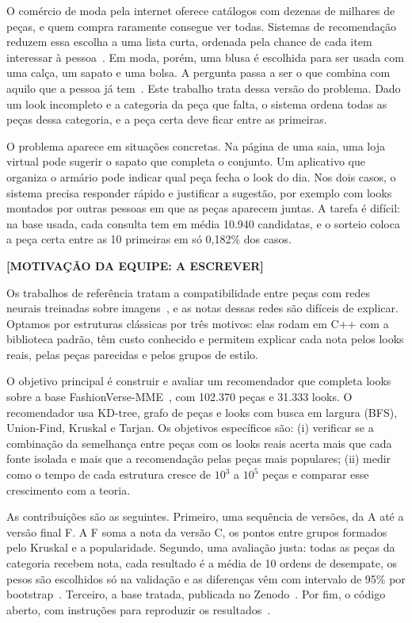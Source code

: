 O comércio de moda pela internet oferece catálogos com dezenas de milhares de peças, e quem compra raramente consegue ver todas. Sistemas de recomendação reduzem essa escolha a uma lista curta, ordenada pela chance de cada item interessar à pessoa~\cite{deshpande2004}. Em moda, porém, uma blusa é escolhida para ser usada com uma calça, um sapato e uma bolsa. A pergunta passa a ser o que combina com aquilo que a pessoa já tem~\cite{han2017,vasileva2018}. Este trabalho trata dessa versão do problema. Dado um look incompleto e a categoria da peça que falta, o sistema ordena todas as peças dessa categoria, e a peça certa deve ficar entre as primeiras.

O problema aparece em situações concretas. Na página de uma saia, uma loja virtual pode sugerir o sapato que completa o conjunto. Um aplicativo que organiza o armário pode indicar qual peça fecha o look do dia. Nos dois casos, o sistema precisa responder rápido e justificar a sugestão, por exemplo com looks montados por outras pessoas em que as peças aparecem juntas. A tarefa é difícil: na base usada, cada consulta tem em média 10.940 candidatas, e o sorteio coloca a peça certa entre as 10 primeiras em só 0,182\% dos casos.

\textbf{[MOTIVAÇÃO DA EQUIPE: A ESCREVER]}

Os trabalhos de referência tratam a compatibilidade entre peças com redes neurais treinadas sobre imagens~\cite{han2017,vasileva2018,mcauley2015}, e as notas dessas redes são difíceis de explicar. Optamos por estruturas clássicas por três motivos: elas rodam em C++ com a biblioteca padrão, têm custo conhecido e permitem explicar cada nota pelos looks reais, pelas peças parecidas e pelos grupos de estilo.

O objetivo principal é construir e avaliar um recomendador que completa looks sobre a base FashionVerse-MME~\cite{fashionverse}, com 102.370 peças e 31.333 looks. O recomendador usa KD-tree, grafo de peças e looks com busca em largura (BFS), Union-Find, Kruskal e Tarjan. Os objetivos específicos são: (i) verificar se a combinação da semelhança entre peças com os looks reais acerta mais que cada fonte isolada e mais que a recomendação pelas peças mais populares; (ii) medir como o tempo de cada estrutura cresce de $10^3$ a $10^5$ peças e comparar esse crescimento com a teoria.

As contribuições são as seguintes. Primeiro, uma sequência de versões, da A até a versão final F. A F soma a nota da versão C, os pontos entre grupos formados pelo Kruskal e a popularidade. Segundo, uma avaliação justa: todas as peças da categoria recebem nota, cada resultado é a média de 10 ordens de desempate, os pesos são escolhidos só na validação e as diferenças vêm com intervalo de 95\% por bootstrap~\cite{efron1979}. Terceiro, a base tratada, publicada no Zenodo~\cite{zenodo}. Por fim, o código aberto, com instruções para reproduzir os resultados~\cite{repositorio}.

